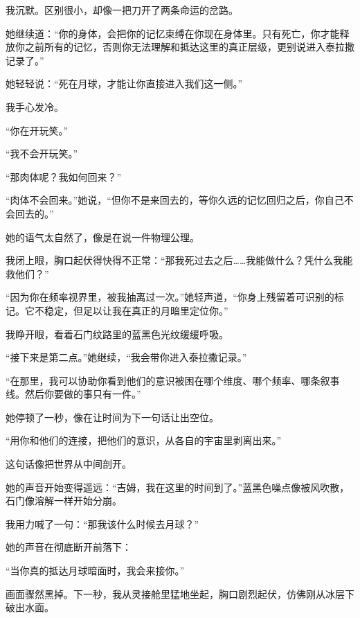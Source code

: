 我沉默。区别很小，却像一把刀开了两条命运的岔路。

她继续道：“你的身体，会把你的记忆束缚在你现在身体里。只有死亡，你才能释放你之前所有的记忆，否则你无法理解和抵达这里的真正层级，更别说进入泰拉撒记录了。”

她轻轻说：“死在月球，才能让你直接进入我们这一侧。”

我手心发冷。

“你在开玩笑。”

“我不会开玩笑。”

“那肉体呢？我如何回来？”

“肉体不会回来。”她说，“但你不是来回去的，等你久远的记忆回归之后，你自己不会回去的。”

她的语气太自然了，像是在说一件物理公理。

我闭上眼，胸口起伏得快得不正常：“那我死过去之后……我能做什么？凭什么我能救他们？”

“因为你在频率视界里，被我抽离过一次。”她轻声道，“你身上残留着可识别的标记。它不稳定，但足以让我在真正的月暗里定位你。”

我睁开眼，看着石门纹路里的蓝黑色光纹缓缓呼吸。

“接下来是第二点。”她继续，“我会带你进入泰拉撒记录。”

“在那里，我可以协助你看到他们的意识被困在哪个维度、哪个频率、哪条叙事线。然后你要做的事只有一件。”

她停顿了一秒，像在让时间为下一句话让出空位。

“用你和他们的连接，把他们的意识，从各自的宇宙里剥离出来。”

这句话像把世界从中间剖开。

她的声音开始变得遥远：“吉姆，我在这里的时间到了。”蓝黑色噪点像被风吹散，石门像溶解一样开始分崩。

我用力喊了一句：“那我该什么时候去月球？”

她的声音在彻底断开前落下：

“当你真的抵达月球暗面时，我会来接你。”

画面骤然黑掉。下一秒，我从灵接舱里猛地坐起，胸口剧烈起伏，仿佛刚从冰层下破出水面。
